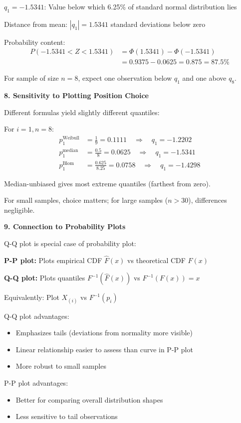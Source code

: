 \documentclass[12pt]{article}
\begin{document}
\begin{explanation}
$q_1 = -1.5341$: Value below which 6.25\% of standard normal distribution lies

Distance from mean: $|q_1| = 1.5341$ standard deviations below zero

Probability content:
\begin{align*}
P(-1.5341 < Z < 1.5341) &= \Phi(1.5341) - \Phi(-1.5341) \\
&= 0.9375 - 0.0625 = 0.875 = 87.5\%
\end{align*}

For sample of size $n=8$, expect one observation below $q_1$ and one above $q_8$.

\textbf{8. Sensitivity to Plotting Position Choice}

Different formulas yield slightly different quantiles:

For $i=1, n=8$:
\begin{align*}
p_1^{\text{Weibull}} &= \frac{1}{9} = 0.1111 \quad \Rightarrow \quad q_1 = -1.2202 \\
p_1^{\text{median}} &= \frac{0.5}{8} = 0.0625 \quad \Rightarrow \quad q_1 = -1.5341 \\
p_1^{\text{Blom}} &= \frac{0.625}{8.25} = 0.0758 \quad \Rightarrow \quad q_1 = -1.4298
\end{align*}

Median-unbiased gives most extreme quantiles (farthest from zero).

For small samples, choice matters; for large samples ($n > 30$), differences negligible.

\textbf{9. Connection to Probability Plots}

Q-Q plot is special case of probability plot:

\textbf{P-P plot:} Plots empirical CDF $\hat{F}(x)$ vs theoretical CDF $F(x)$

\textbf{Q-Q plot:} Plots quantiles $F^{-1}(\hat{F}(x))$ vs $F^{-1}(F(x)) = x$

Equivalently: Plot $X_{(i)}$ vs $F^{-1}(p_i)$

Q-Q plot advantages:
\begin{itemize}
\item Emphasizes tails (deviations from normality more visible)
\item Linear relationship easier to assess than curve in P-P plot
\item More robust to small samples
\end{itemize}

P-P plot advantages:
\begin{itemize}
\item Better for comparing overall distribution shapes
\item Less sensitive to tail observations
\end{itemize}


\end{explanation}
\end{document}

